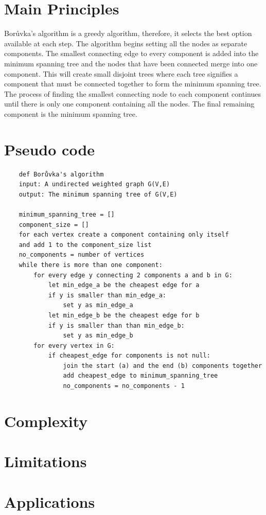 \documentclass[a4paper,11pt]{article}
\begin{document}
\section{Main Principles}

Borůvka's algorithm is a greedy algorithm, therefore, it selects the best option available at each step. The algorithm begins setting all the nodes as separate components. The smallest connecting edge to every component is added into the minimum spanning tree and the nodes that have been connected merge into one component. This will create small disjoint trees where each tree signifies a component that must be connected together to form the minimum spanning tree. The process of finding the smallest connecting node to each component continues until there is only one component containing all the nodes. The final remaining component is the minimum spanning tree.
\newpage
\section{Pseudo code}
\begin{verbatim}
    def Borůvka's algorithm
    input: A undirected weighted graph G(V,E)
    output: The minimum spanning tree of G(V,E)
    
    minimum_spanning_tree = []
    component_size = []
    for each vertex create a component containing only itself 
    and add 1 to the component_size list
    no_components = number of vertices
    while there is more than one component:
        for every edge y connecting 2 components a and b in G:
            let min_edge_a be the cheapest edge for a 
            if y is smaller than min_edge_a:
                set y as min_edge_a
            let min_edge_b be the cheapest edge for b
            if y is smaller than than min_edge_b:
                set y as min_edge_b
        for every vertex in G:
            if cheapest_edge for components is not null:
                join the start (a) and the end (b) components together
                add cheapest_edge to minimum_spanning_tree
                no_components = no_components - 1

\end{verbatim}

\section{Complexity}

\section{Limitations}

\section{Applications}


\end{document}
